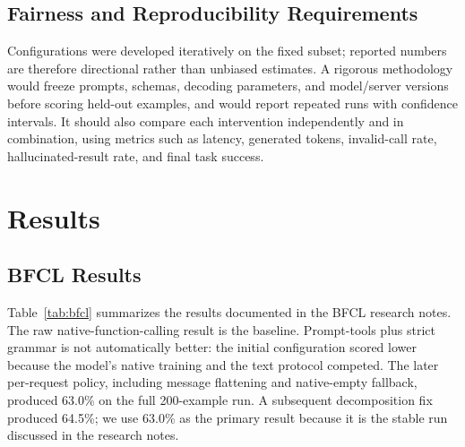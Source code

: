\documentclass[conference]{IEEEtran}
\begin{document}
\subsection{Fairness and Reproducibility Requirements}

Configurations were developed iteratively on the fixed subset; reported numbers are therefore
directional rather than unbiased estimates. A rigorous methodology would freeze prompts, schemas,
decoding parameters, and model/server versions before scoring held-out examples, and would report
repeated runs with confidence intervals. It should also compare each intervention independently
and in combination, using metrics such as latency, generated tokens, invalid-call rate,
hallucinated-result rate, and final task success.

\section{Results}

\subsection{BFCL Results}

Table~\ref{tab:bfcl} summarizes the results documented in the BFCL research notes. The raw
native-function-calling result is the baseline. Prompt-tools plus strict grammar is not
automatically better: the initial configuration scored lower because the model's native
training and the text protocol competed. The later per-request policy, including message
flattening and native-empty fallback, produced 63.0\% on the full 200-example run. A
subsequent decomposition fix produced 64.5\%; we use 63.0\% as the primary result because it
is the stable run discussed in the research notes.

\begin{table}[t]
\centering
\caption{BFCL v4 results on the fixed 200-example subset. Values are percentages. Run D is the per-request policy plus BFCL message flattening and native-empty fallback; Run E reached 64.5\% after an additional decomposition fix.}
\label{tab:bfcl}
\end{table}
\end{document}
